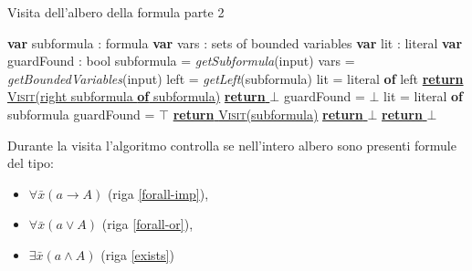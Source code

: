 \begin{algorithm}[H]
    \caption{Visita dell'albero della formula parte 2}
    \begin{algorithmic}[1]
            \Switch{$\forall$}
                \State \textbf{var} subformula : formula
                \State \textbf{var} vars : sets of bounded variables 
                \State \textbf{var} lit : literal
                \State \textbf{var} guardFound : bool
                \State subformula = \emph{getSubformula}(input)
                \State vars = \emph{getBoundedVariables}(input)
                \State left = \emph{getLeft}(subformula)
                 \label{forall-imp}
                    \State lit = literal \textbf{of} left
                     \label{pos-guard-for}
                        \State \underline{\textbf{return} \textsc{Visit}(right subformula \textbf{of} subformula)} 
                    \Else
                        \State \underline{\textbf{return} $\bot$}
                    \EndIf
                 \label{forall-or}
                    \State guardFound = $\bot$
                            \State lit = literal \textbf{of} subformula
                             \label{neg-guard}
                                \State guardFound = $\top$
                            \EndIf
                        \EndIf
                    \EndWhile
                        \State \underline{\textbf{return} \textsc{Visit}(subformula)} 
                    \Else
                        \State \underline{\textbf{return} $\bot$}
                    \EndIf
                \EndIf
                \State \underline{\textbf{return} $\bot$}
            \EndSwitch 
        \EndCase
        \EndFunction
    \end{algorithmic}
\end{algorithm}
Durante la visita l'algoritmo controlla se nell'intero albero sono presenti formule del tipo: 
\begin{itemize}
    \item $\forall\bar{x}(a \rightarrow A)$ (riga \ref{forall-imp}), 
    \item $\forall\bar{x}(a \lor A)$ (riga \ref{forall-or}),
    \item $\exists\bar{x}(a \land A)$ (riga \ref{exists})
\end{itemize}
